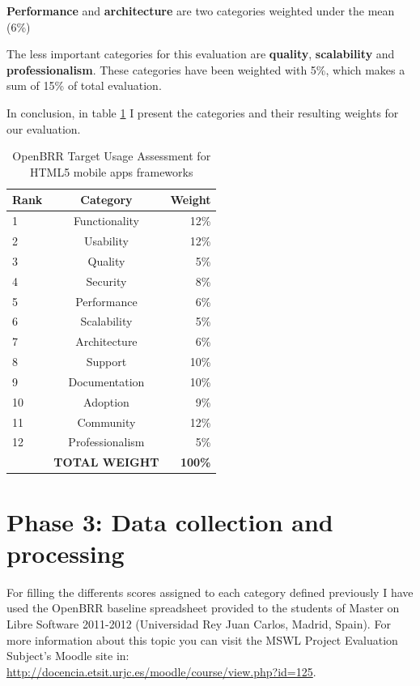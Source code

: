 \documentclass[a4paper,12pt]{book}
\begin{document}
\textbf{Performance} and \textbf{architecture} are two categories weighted under the mean (6\%)

The less important categories for this evaluation are \textbf{quality},
\textbf{scalability} and \textbf{professionalism}. These categories have been
weighted with 5\%, which makes a sum of 15\% of total evaluation. 

In conclusion, in table \ref{OpenBRR2} I present the categories and
their resulting weights for our evaluation.

\begin{table}[ht]
\begin{center}
    \begin{tabular}{ | l | c | r |}
    \hline
    \textbf{Rank} & \textbf{Category} & \textbf{Weight} \\ \hline
    1 & Functionality & 12\% \\ \hline
    2 & Usability & 12\% \\ \hline
    3 & Quality & 5\% \\ \hline
    4 & Security & 8\% \\ \hline
    5 & Performance & 6\% \\ \hline
    6 & Scalability & 5\% \\ \hline
    7 & Architecture & 6\% \\ \hline
    8 & Support & 10\% \\ \hline
    9 & Documentation & 10\% \\ \hline
    10 & Adoption & 9\% \\ \hline
    11 & Community & 12\% \\ \hline
    12 & Professionalism & 5\% \\ \hline
     & \textbf{TOTAL WEIGHT} & \textbf{100\%} \\ \hline  
    \end{tabular}
\end{center}
 \caption{OpenBRR Target Usage Assessment for HTML5 mobile apps frameworks}
\label{OpenBRR2}
\end{table}

\section{Phase 3: Data collection and processing}
\label{sec:phase3}
For filling the differents scores assigned to each category defined previously I have used the OpenBRR baseline spreadsheet provided to the students of Master on Libre Software 2011-2012 (Universidad Rey Juan Carlos, Madrid, Spain).
For more information about this topic you can visit the MSWL Project Evaluation Subject's Moodle site in:\\
\url{http://docencia.etsit.urjc.es/moodle/course/view.php?id=125}. 
\end{document}
